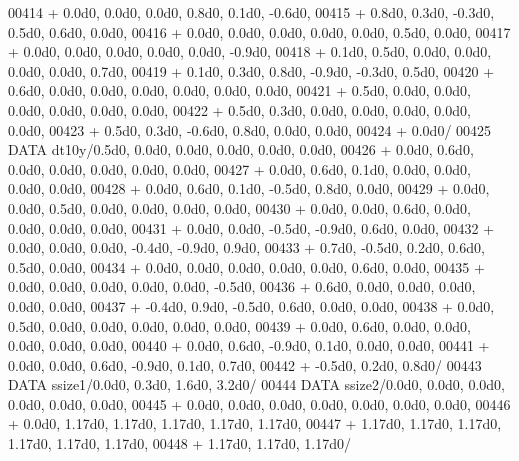 \begin{DoxyCode}
00414      +                  0.0d0, 0.0d0, 0.0d0, 0.8d0, 0.1d0, -0.6d0,
00415      +                  0.8d0, 0.3d0, -0.3d0, 0.5d0, 0.6d0, 0.0d0,
00416      +                  0.0d0, 0.0d0, 0.0d0, 0.0d0, 0.0d0, 0.5d0, 0.0d0,
00417      +                  0.0d0, 0.0d0, 0.0d0, 0.0d0, 0.0d0, -0.9d0,
00418      +                  0.1d0, 0.5d0, 0.0d0, 0.0d0, 0.0d0, 0.0d0, 0.7d0,
00419      +                  0.1d0, 0.3d0, 0.8d0, -0.9d0, -0.3d0, 0.5d0,
00420      +                  0.6d0, 0.0d0, 0.0d0, 0.0d0, 0.0d0, 0.0d0, 0.0d0,
00421      +                  0.5d0, 0.0d0, 0.0d0, 0.0d0, 0.0d0, 0.0d0, 0.0d0,
00422      +                  0.5d0, 0.3d0, 0.0d0, 0.0d0, 0.0d0, 0.0d0, 0.0d0,
00423      +                  0.5d0, 0.3d0, -0.6d0, 0.8d0, 0.0d0, 0.0d0,
00424      +                  0.0d0/
00425       \textcolor{keyword}{DATA}              dt10y/0.5d0, 0.0d0, 0.0d0, 0.0d0, 0.0d0, 0.0d0,
00426      +                  0.0d0, 0.6d0, 0.0d0, 0.0d0, 0.0d0, 0.0d0, 0.0d0,
00427      +                  0.0d0, 0.6d0, 0.1d0, 0.0d0, 0.0d0, 0.0d0, 0.0d0,
00428      +                  0.0d0, 0.6d0, 0.1d0, -0.5d0, 0.8d0, 0.0d0,
00429      +                  0.0d0, 0.0d0, 0.5d0, 0.0d0, 0.0d0, 0.0d0, 0.0d0,
00430      +                  0.0d0, 0.0d0, 0.6d0, 0.0d0, 0.0d0, 0.0d0, 0.0d0,
00431      +                  0.0d0, 0.0d0, -0.5d0, -0.9d0, 0.6d0, 0.0d0,
00432      +                  0.0d0, 0.0d0, 0.0d0, -0.4d0, -0.9d0, 0.9d0,
00433      +                  0.7d0, -0.5d0, 0.2d0, 0.6d0, 0.5d0, 0.0d0,
00434      +                  0.0d0, 0.0d0, 0.0d0, 0.0d0, 0.0d0, 0.6d0, 0.0d0,
00435      +                  0.0d0, 0.0d0, 0.0d0, 0.0d0, 0.0d0, -0.5d0,
00436      +                  0.6d0, 0.0d0, 0.0d0, 0.0d0, 0.0d0, 0.0d0,
00437      +                  -0.4d0, 0.9d0, -0.5d0, 0.6d0, 0.0d0, 0.0d0,
00438      +                  0.0d0, 0.5d0, 0.0d0, 0.0d0, 0.0d0, 0.0d0, 0.0d0,
00439      +                  0.0d0, 0.6d0, 0.0d0, 0.0d0, 0.0d0, 0.0d0, 0.0d0,
00440      +                  0.0d0, 0.6d0, -0.9d0, 0.1d0, 0.0d0, 0.0d0,
00441      +                  0.0d0, 0.0d0, 0.6d0, -0.9d0, 0.1d0, 0.7d0,
00442      +                  -0.5d0, 0.2d0, 0.8d0/
00443       \textcolor{keyword}{DATA}              ssize1/0.0d0, 0.3d0, 1.6d0, 3.2d0/
00444       \textcolor{keyword}{DATA}              ssize2/0.0d0, 0.0d0, 0.0d0, 0.0d0, 0.0d0, 0.0d0,
00445      +                  0.0d0, 0.0d0, 0.0d0, 0.0d0, 0.0d0, 0.0d0, 0.0d0,
00446      +                  0.0d0, 1.17d0, 1.17d0, 1.17d0, 1.17d0, 1.17d0,
00447      +                  1.17d0, 1.17d0, 1.17d0, 1.17d0, 1.17d0, 1.17d0,
00448      +                  1.17d0, 1.17d0, 1.17d0/

\end{DoxyCode}

